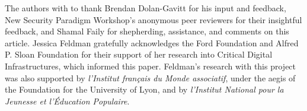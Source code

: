 The authors with to thank Brendan Dolan-Gavitt for his input and feedback, New Security Paradigm Workshop’s anonymous peer reviewers for their insightful feedback, and Shamal Faily for shepherding, assistance, and comments on this article. Jessica Feldman gratefully acknowledges the Ford Foundation and Alfred P. Sloan Foundation for their support of her research into Critical Digital Infrastructures, which informed this paper. Feldman’s research with this project was also supported by \textit{l’Institut français du Monde associatif}, under the aegis of the Foundation for the University of Lyon, and by \textit{l’Institut National pour la Jeunesse et l'Éducation Populaire}.
